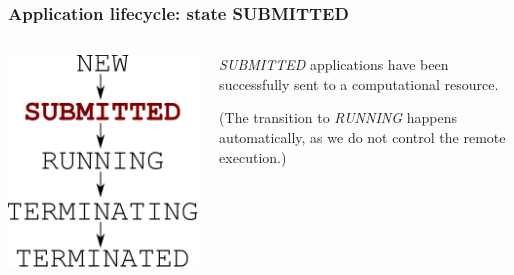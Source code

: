 \documentclass[english,serif,mathserif,xcolor=pdftex,dvipsnames,table]{beamer}
\begin{document}
\begin{frame}[fragile]
\frametitle{Application lifecycle: state SUBMITTED}
\begin{columns}[c]
  \begin{column}{0.5\textwidth}
    \includegraphics[height=0.7\textheight]{fig/state-SUBMITTED}
  \end{column}
  \begin{column}{0.4\textwidth}
    \raggedleft

    \emph{SUBMITTED} applications have been successfully sent to a
    computational resource.

    \+
    (The transition to \emph{RUNNING} happens automatically, as we
    do not control the remote execution.)
  \end{column}
\end{columns}
\end{frame}
\end{document}
